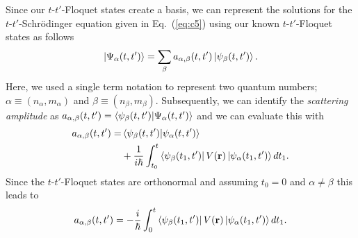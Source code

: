 \documentclass[
 reprint,
 amsmath,amssymb,
 aps,
 prb,
]{revtex4-2}
\begin{document}
Since our $t$-$t'$-Floquet states create a basis, we can represent the solutions for the $t$-$t'$-Schrödinger equation given in Eq.~(\ref{eq:c5}) using our known $t$-$t'$-Floquet states as follows
\begin{equation} \label{eq:c12}
  \ket{\Psi_{\alpha}(t,t')} = \sum_{\beta} a_{\alpha,\beta}(t,t')
  \ket{\psi_{\beta}(t,t')}.
\end{equation}
Here, we used a single term notation to represent two quantum numbers; $\alpha \equiv (n_{\alpha},m_{\alpha})$ and $\beta \equiv (n_{\beta},m_{\beta})$.
Subsequently, we can identify the \textit{scattering amplitude} as $a_{\alpha,\beta}(t,t') =
\braket{\psi_{\beta}(t,t')}{\Psi_{\alpha}(t,t')}$ and we can evaluate this with
\begin{equation} \label{eq:c13}
  \begin{aligned}
  a_{\alpha,\beta}(t,t') = &
  \braket{\psi_{\beta}(t,t')}{\psi_{\alpha}(t,t')} \\
  &+
  \frac{1}{i\hbar}
  \int_{t_0}^t
  \bra{\psi_{\beta}(t_1,t')}
  V(\vb{r}) \ket{\psi_{\alpha}(t_1,t')} dt_1.
  \end{aligned}
\end{equation}
Since the $t$-$t'$-Floquet states are orthonormal and assuming $t_0 = 0$ and $\alpha \neq \beta$ this leads to
\begin{equation} \label{eq:c14}
  a_{\alpha,\beta}(t,t') =
  -
  \frac{i}{\hbar}
  \int_{0}^t
  \bra{\psi_{\beta}(t_1,t')}
  V(\vb{r}) \ket{\psi_{\alpha}(t_1,t')} dt_1.
\end{equation}
\end{document}
